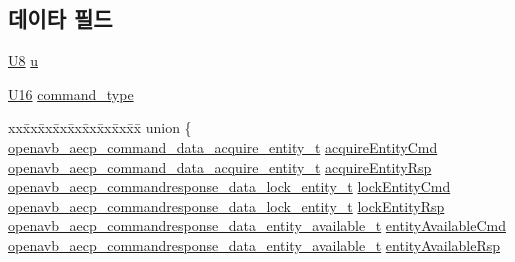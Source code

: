 \subsection*{데이타 필드}
\begin{DoxyCompactItemize}
\item 
\hyperlink{openavb__types__base__pub_8h_aa63ef7b996d5487ce35a5a66601f3e73}{U8} \hyperlink{structopenavb__aecp__entity__model__data__unit__t_a9dc54b317bbb4de0e9975e4f535f4a62}{u}
\item 
\hyperlink{openavb__types__base__pub_8h_a0a0a322d5fa4a546d293a77ba8b4a71f}{U16} \hyperlink{structopenavb__aecp__entity__model__data__unit__t_a448ca35c15a0f96705a67d23603e61bf}{command\+\_\+type}
\item 
\begin{tabbing}
xx\=xx\=xx\=xx\=xx\=xx\=xx\=xx\=xx\=\kill
union \{\\
\>\hyperlink{structopenavb__aecp__command__data__acquire__entity__t}{openavb\_aecp\_command\_data\_acquire\_entity\_t} \hyperlink{structopenavb__aecp__entity__model__data__unit__t_ace615330bf6f576e658a2abb6fa98498}{acquireEntityCmd}\\
\>\hyperlink{structopenavb__aecp__command__data__acquire__entity__t}{openavb\_aecp\_command\_data\_acquire\_entity\_t} \hyperlink{structopenavb__aecp__entity__model__data__unit__t_afffc7245f69418920a026a238d59347b}{acquireEntityRsp}\\
\>\hyperlink{structopenavb__aecp__commandresponse__data__lock__entity__t}{openavb\_aecp\_commandresponse\_data\_lock\_entity\_t} \hyperlink{structopenavb__aecp__entity__model__data__unit__t_a70f1c88e295998e3c1c6c650dd2343d8}{lockEntityCmd}\\
\>\hyperlink{structopenavb__aecp__commandresponse__data__lock__entity__t}{openavb\_aecp\_commandresponse\_data\_lock\_entity\_t} \hyperlink{structopenavb__aecp__entity__model__data__unit__t_aa2a5d5c2241c518f59f729123e39403b}{lockEntityRsp}\\
\>\hyperlink{structopenavb__aecp__commandresponse__data__entity__available__t}{openavb\_aecp\_commandresponse\_data\_entity\_available\_t} \hyperlink{structopenavb__aecp__entity__model__data__unit__t_a64321f46fa646b0f921e57e6c0d4c2ac}{entityAvailableCmd}\\
\>\hyperlink{structopenavb__aecp__commandresponse__data__entity__available__t}{openavb\_aecp\_commandresponse\_data\_entity\_available\_t} \hyperlink{structopenavb__aecp__entity__model__data__unit__t_a00745c03c87cfbe66c7983b32e49d237}{entityAvailableRsp}\\

\end{tabbing}
\end{DoxyCompactItemize}
